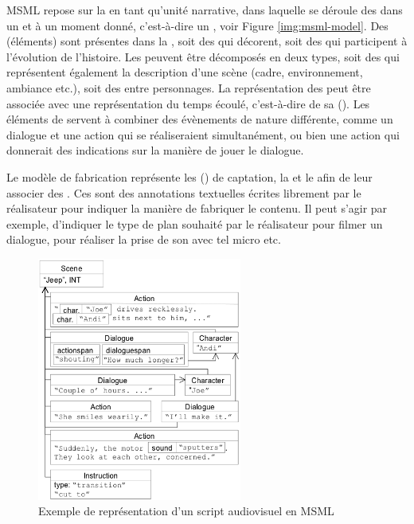 MSML repose sur la  en tant qu'unité narrative, dans laquelle se déroule des  dans un  et à un moment donné, c'est-à-dire un , voir Figure \ref{img:msml-model}.
Des  (éléments) sont présentes dans la , soit des  qui décorent, soit des  qui participent à l'évolution de l'histoire.
Les  peuvent être décomposés en deux types, soit des  qui représentent également la description d'une scène (cadre, environnement, ambiance etc.), soit des  entre personnages.
La représentation des  peut être associée avec une représentation du temps écoulé, c'est-à-dire de sa  ().
Les éléments de  servent à combiner des évènements de nature différente, comme un dialogue et une action qui se réaliseraient  simultanément, ou bien une action qui donnerait des indications sur la manière de jouer le dialogue.


Le modèle de fabrication représente les  () de captation, la  et le  afin de leur associer des .
Ces  sont des annotations textuelles écrites librement par le réalisateur pour indiquer la manière de fabriquer le contenu.
Il peut s'agir par exemple, d'indiquer le type de plan souhaité par le réalisateur pour filmer un dialogue, pour réaliser la prise de son avec tel micro etc.

\begin{figure}[ht!]
\centering
\includegraphics[width=0.6\textwidth]{images/MSML-sceneExample.png}
\caption{Exemple de représentation d'un script audiovisuel en MSML}
\label{img:msml-ex}
\end{figure}

